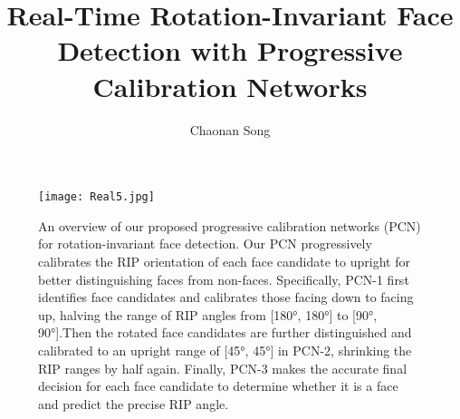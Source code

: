 \documentclass{article}
\title{Real-Time Rotation-Invariant Face Detection with Progressive Calibration Networks}
\author{Chaonan Song}
\begin{document}

\maketitle
\begin{figure}[H]
            \centering
            \texttt{[image: Real5.jpg]}
            \caption{An overview of our proposed progressive calibration networks (PCN) for rotation-invariant face detection. Our PCN progressively
            calibrates the RIP orientation of each face candidate to upright for better distinguishing faces from non-faces. Specifically, PCN-1 first identifies face candidates and calibrates those facing down to facing up, halving the range of RIP angles from [\ang{180}, \ang{180}] to [\ang{90}, \ang{90}].Then the rotated face candidates are further distinguished and calibrated to an upright range of [\ang{45}, \ang{45}] in PCN-2, shrinking the RIP ranges by half again. Finally, PCN-3 makes the accurate final decision for each face candidate to determine whether it is a face and predict the precise RIP angle.}
            \label{fig:1}
\end{figure}
\end{document}
